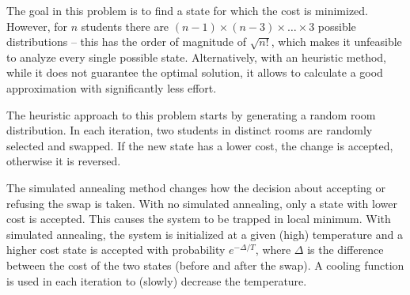 The goal in this problem is to find a state for which the cost is minimized. However, for $n$ students there are $(n-1)\times (n-3)\times\ldots\times 3$ possible distributions -- this has the order of magnitude of $\sqrt{n!}$, which makes it unfeasible to analyze every single possible state. Alternatively, with an heuristic method, while it does not guarantee the optimal solution, it allows to calculate a good approximation with significantly less effort.

The heuristic approach to this problem starts by generating a random room distribution. In each iteration, two students in distinct rooms are randomly selected and swapped. If the new state has a lower cost, the change is accepted, otherwise it is reversed.

The simulated annealing method changes how the decision about accepting or refusing the swap is taken. With no simulated annealing, only a state with lower cost is accepted. This causes the system to be trapped in local minimum. With simulated annealing, the system is initialized at a given (high) temperature and a higher cost state is accepted with probability $e^{-\Delta/T}$, where $\Delta$ is the difference between the cost of the two states (before and after the swap). A cooling function is used in each iteration to (slowly) decrease the temperature.
